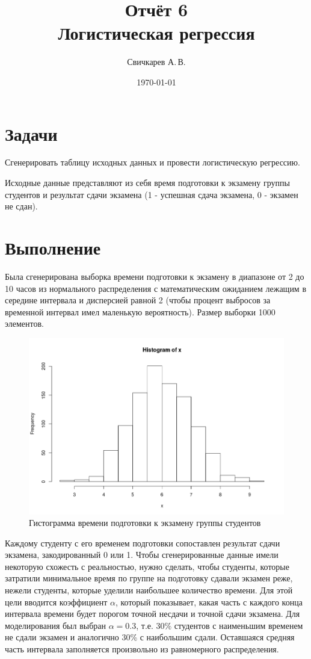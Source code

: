 \documentclass{article} %
\title{Отчёт 6\\
Логистическая регрессия} %
\author{Свичкарев А.\,В.} %
\date{\today} %
\begin{document}

\maketitle %

\section*{Задачи}
Сгенерировать таблицу исходных данных
и провести логистическую регрессию.

Исходные данные представляют из себя
время подготовки к экзамену группы студентов
и результат сдачи экзамена
(1 - успешная сдача экзамена,
0 - экзамен не сдан).

\clearpage
\section*{Выполнение}

Была сгенерирована выборка времени
подготовки к экзамену в диапазоне
от 2 до 10 часов из нормального распределения
с математическим ожиданием лежащим в середине интервала
и дисперсией равной 2
(чтобы процент выбросов за временной интервал
имел маленькую вероятность).
Размер выборки 1000 элементов.

\begin{figure}[H]
    \centering
    \includegraphics[width=\textwidth]{hist}
    \caption{Гистограмма времени подготовки
    к экзамену группы студентов}
\end{figure}

Каждому студенту с его временем подготовки
сопоставлен результат сдачи экзамена,
закодированный 0 или 1.
Чтобы сгенерированные данные имели
некоторую схожесть с реальностью,
нужно сделать, чтобы студенты,
которые затратили минимальное время по группе
на подготовку сдавали экзамен реже,
нежели студенты, которые уделили
наибольшее количество времени.
Для этой цели вводится коэффициент $\alpha$,
который показывает, какая часть с каждого
конца интервала времени будет порогом
точной несдачи и точной сдачи экзамена.
Для моделирования был выбран $\alpha = 0.3$,
т.е. 30\% студентов с наименьшим временем
не сдали экзамен и аналогично 30\%
с наибольшим сдали.
Оставшаяся средняя часть интервала
заполняется произвольно
из равномерного распределения.
\end{document}
